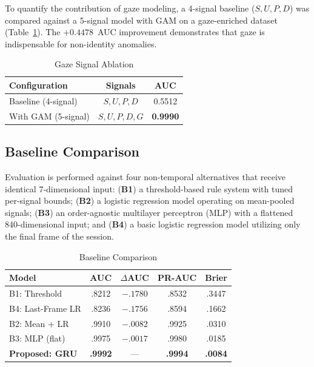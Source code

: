 \documentclass[journal]{IEEEtran}
\begin{document}
To quantify the contribution of gaze modeling, a 4-signal baseline ($S, U, P, D$) was compared against a 5-signal model with GAM on a gaze-enriched dataset (Table~\ref{tab:ablation_gaze}). The $+0.4478$~AUC improvement demonstrates that gaze is indispensable for non-identity anomalies.

\begin{table}[!ht]
\caption{Gaze Signal Ablation}
\label{tab:ablation_gaze}
\centering
\footnotesize
\begin{tabular}{@{}lcc@{}}
\toprule
\textbf{Configuration} & \textbf{Signals} & \textbf{AUC} \\
\midrule
Baseline (4-signal) & $S, U, P, D$ & 0.5512 \\
With GAM (5-signal) & $S, U, P, D, G$ & \textbf{0.9990} \\
\bottomrule
\end{tabular}
\end{table}

\subsection{Baseline Comparison}

Evaluation is performed against four non-temporal alternatives that receive identical 7-dimensional input: (\textbf{B1}) a threshold-based rule system with tuned per-signal bounds; (\textbf{B2}) a logistic regression model operating on mean-pooled signals; (\textbf{B3}) an order-agnostic multilayer perceptron (MLP) with a flattened 840-dimensional input; and (\textbf{B4}) a basic logistic regression model utilizing only the final frame of the session.

\begin{table}[!ht]
\caption{Baseline Comparison}
\label{tab:baselines}
\centering
\footnotesize
\begin{tabular}{@{}lcccc@{}}
\toprule
\textbf{Model} & \textbf{AUC} & \textbf{$\Delta$AUC} & \textbf{PR-AUC} & \textbf{Brier} \\
\midrule
B1: Threshold & .8212 & $-.1780$ & .8532 & .3447 \\
B4: Last-Frame LR & .8236 & $-.1756$ & .8594 & .1662 \\
B2: Mean + LR & .9910 & $-.0082$ & .9925 & .0310 \\
B3: MLP (flat) & .9975 & $-.0017$ & .9980 & .0185 \\
\textbf{Proposed: GRU} & \textbf{.9992} & --- & \textbf{.9994} & \textbf{.0084} \\
\bottomrule
\end{tabular}
\end{table}
\end{document}

